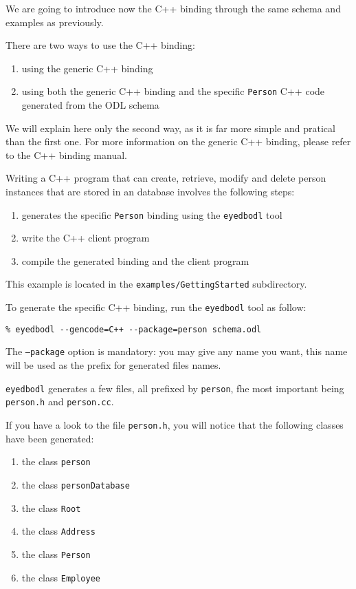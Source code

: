 We are going to introduce now the C++ binding through the same schema
and examples as previously.

There are two ways to use the C++ binding: 
\begin{enumerate}
\item using the generic C++ binding
\item using both the generic C++ binding and the specific \texttt{Person} C++ code generated from the ODL schema
\end{enumerate}

We will explain here only the second way, as it is far more simple and pratical than the first one. For more information on the generic C++ binding, please refer to the C++ binding manual.

Writing a C++ program that can create, retrieve, modify and delete person instances that are stored in an \eyedb database involves the following steps:
\begin{enumerate}
\item generates the specific \texttt{Person} binding using the \texttt{eyedbodl} tool
\item write the C++ client program
\item compile the generated binding and the client program
\end{enumerate}

This example is located in the \texttt{examples/GettingStarted} subdirectory.


To generate the specific C++ binding, run the \texttt{eyedbodl} tool as follow:
\verbsize \begin{verbatim}
% eyedbodl --gencode=C++ --package=person schema.odl
\end{verbatim}
\normalsize
The \texttt{--package} option is mandatory: you may give any name you want, this name will 
be used as the prefix for generated files names.

\texttt{eyedbodl} generates a few files, all prefixed by \texttt{person}, fhe most important 
being \texttt{person.h} and \texttt{person.cc}.

If you have a look to the file \texttt{person.h},
you will notice that the following classes have been generated:
\begin{enumerate}
\item the class \texttt{person}
\item the class \texttt{personDatabase}
\item the class \texttt{Root}
\item the class \texttt{Address}
\item the class \texttt{Person}
\item the class \texttt{Employee}
\end{enumerate}

